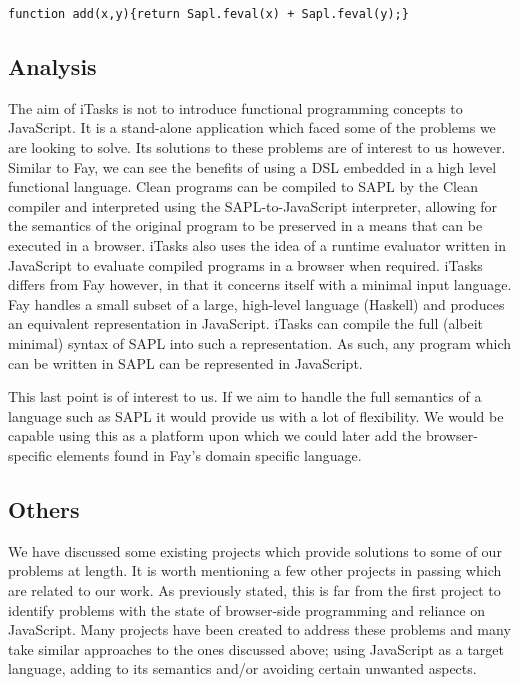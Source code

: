 \begin{center}
  \verb!function add(x,y){return Sapl.feval(x) + Sapl.feval(y);}!
\end{center}

\subsection{Analysis}
The aim of iTasks is not to introduce functional programming concepts
to JavaScript. It is a stand-alone application which faced some of the
problems we are looking to solve. Its solutions to these problems are
of interest to us however. Similar to Fay, we can see the benefits of using a
DSL embedded in a high level functional language. Clean programs can
be compiled to SAPL by the Clean compiler and interpreted using the
SAPL-to-JavaScript interpreter, allowing for the semantics of the
original program to be preserved in a means that can be executed in
a browser. iTasks also uses the idea of a runtime evaluator written
in JavaScript to evaluate compiled programs in a browser when required.
iTasks differs from Fay however, in that it concerns itself with a 
minimal input language. Fay handles a small subset of a large, high-level
language (Haskell) and produces an equivalent representation in JavaScript.
iTasks can compile the full (albeit minimal) syntax of SAPL into such
a representation. As such, any program which can be written in SAPL can
be represented in JavaScript. 

This last point is of interest to us. If we aim to handle the full
semantics of a language such as SAPL it would provide us with a
lot of flexibility. We would be capable using this as a platform
upon which we could later add the browser-specific elements found
in Fay's domain specific language. 

\subsection{Others}
We have discussed some existing projects which provide solutions to 
some of our problems at length. It is worth mentioning a few other 
projects in passing which are related to our work. As previously stated,
this is far from the first project to identify problems with the state
of browser-side programming and reliance on JavaScript. Many projects
have been created to address these problems and many take similar 
approaches to the ones discussed above; using JavaScript as a target
language, adding to its semantics and/or avoiding certain unwanted 
aspects.

